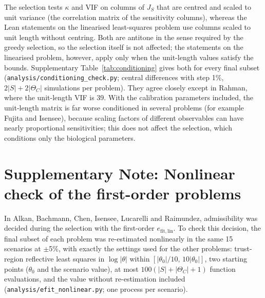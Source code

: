 The selection tests $\kappa$ and VIF on columns of $J_S$ that are centred and scaled to unit variance (the correlation matrix of the sensitivity columns), whereas the Lean statements on the linearised least-squares problem use columns scaled to unit length without centring. Both are antitone in the sense required by the greedy selection, so the selection itself is not affected; the statements on the linearised problem, however, apply only when the unit-length values satisfy the bounds. Supplementary Table~\ref{tab:conditioning} gives both for every final subset (\texttt{analysis/conditioning\_check.py}; central differences with step 1\%, $2|S|+2|\Theta_C|$ simulations per problem). They agree closely except in Rahman, where the unit-length VIF is 39. With the calibration parameters included, the unit-length matrix is far worse conditioned in several problems (for example Fujita and Isensee), because scaling factors of different observables can have nearly proportional sensitivities; this does not affect the selection, which conditions only the biological parameters.

\begin{table}[ht]
\centering\scriptsize
\caption{\textbf{Conditioning of the final subsets.} $\kappa$ and VIF of the selected columns, centred and scaled (as in the selection) and scaled to unit length without centring (as in the Lean statements); last column, $\kappa$ of the unit-length columns of the selected and calibration parameters together.}\label{tab:conditioning}

\end{table}

\section*{Supplementary Note: Nonlinear check of the first-order problems}

In Alkan, Bachmann, Chen, Isensee, Lucarelli and Raimundez, admissibility was decided during the selection with the first-order $e_{\mathrm{fit,lin}}$. To check this decision, the final subset of each problem was re-estimated nonlinearly in the same 15 scenarios at $\pm$5\%, with exactly the settings used for the other problems: trust-region reflective least squares in $\log|\theta|$ within $[|\theta_0|/10,\,10|\theta_0|]$, two starting points ($\theta_0$ and the scenario value), at most $100(|S|+|\Theta_C|+1)$ function evaluations, and the value without re-estimation included (\texttt{analysis/efit\_nonlinear.py}; one process per scenario).

